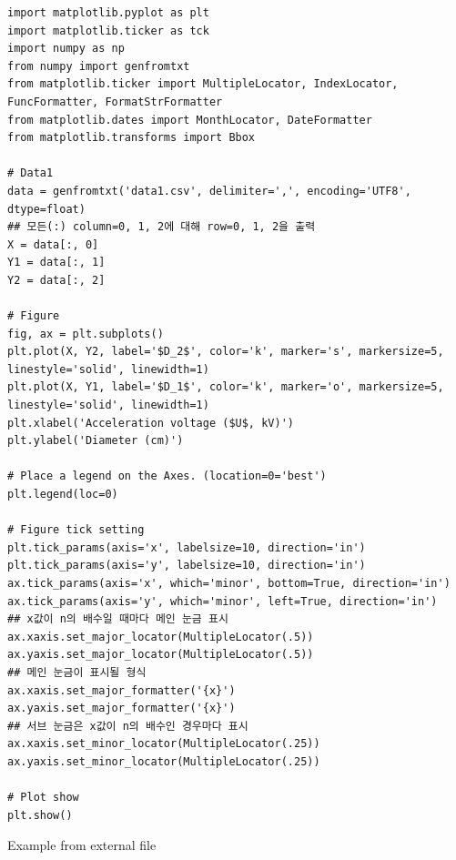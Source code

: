 \documentclass[a4paper, 10pt, nanum]{CSUniSchoolLabReport}
\begin{document}
\begin{listing}[ht!]
	\begin{verbatim}
import matplotlib.pyplot as plt
import matplotlib.ticker as tck
import numpy as np
from numpy import genfromtxt
from matplotlib.ticker import MultipleLocator, IndexLocator, FuncFormatter, FormatStrFormatter
from matplotlib.dates import MonthLocator, DateFormatter
from matplotlib.transforms import Bbox

# Data1
data = genfromtxt('data1.csv', delimiter=',', encoding='UTF8', dtype=float)
## 모든(:) column=0, 1, 2에 대해 row=0, 1, 2을 출력
X = data[:, 0]
Y1 = data[:, 1]
Y2 = data[:, 2]

# Figure
fig, ax = plt.subplots()
plt.plot(X, Y2, label='$D_2$', color='k', marker='s', markersize=5, linestyle='solid', linewidth=1)
plt.plot(X, Y1, label='$D_1$', color='k', marker='o', markersize=5, linestyle='solid', linewidth=1)
plt.xlabel('Acceleration voltage ($U$, kV)')
plt.ylabel('Diameter (cm)')

# Place a legend on the Axes. (location=0='best')
plt.legend(loc=0)

# Figure tick setting
plt.tick_params(axis='x', labelsize=10, direction='in')
plt.tick_params(axis='y', labelsize=10, direction='in')
ax.tick_params(axis='x', which='minor', bottom=True, direction='in')
ax.tick_params(axis='y', which='minor', left=True, direction='in')
## x값이 n의 배수일 때마다 메인 눈금 표시
ax.xaxis.set_major_locator(MultipleLocator(.5)) 
ax.yaxis.set_major_locator(MultipleLocator(.5))
## 메인 눈금이 표시될 형식
ax.xaxis.set_major_formatter('{x}')
ax.yaxis.set_major_formatter('{x}')
## 서브 눈금은 x값이 n의 배수인 경우마다 표시
ax.xaxis.set_minor_locator(MultipleLocator(.25)) 
ax.yaxis.set_minor_locator(MultipleLocator(.25))

# Plot show
plt.show()
	\end{verbatim}
	\caption{Example from external file}
	\label{listing:graph1-code}
\end{listing}
\end{document}
